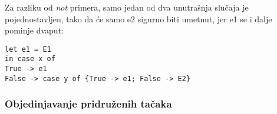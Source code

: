 Za razliku od \textit{not} primera, samo jedan od dva unutrašnja slučaja je pojednostavljen, tako da će samo e2 sigurno biti umetnut, jer e1 se i dalje pominje dvaput:
\begin{verbatim}
let e1 = E1
in case x of
True -> e1
False -> case y of {True -> e1; False -> E2}
\end{verbatim}

%
%
%
%

\subsubsection{Objedinjavanje pridruženih tačaka}
\label{sec:podpodnaslovGeneralization}

